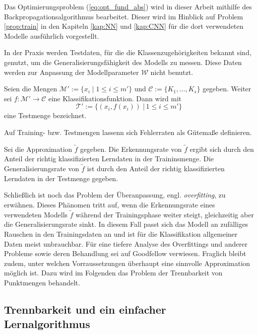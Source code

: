 Das Optimierungsproblem (\ref{eq:opt_fund_abs}) wird in dieser Arbeit mithilfe des Backpropagationsalgorithmus bearbeitet. Dieser wird im Hinblick auf Problem \ref{prop:train} in den Kapiteln \ref{kap:NN} und \ref{kap:CNN} für die dort verwendeten Modelle ausführlich vorgestellt. 

In der Praxis werden Testdaten, für die die Klassenzugehörigkeiten bekannt sind, genutzt, um die Generalisierungsfähigkeit des Modells zu messen. Diese Daten werden zur Anpassung der Modellparameter $\mathcal{W}$ nicht benutzt.

\begin{defi}[Testmenge]
    Seien die Mengen $\mathcal{M}':=\{x_i \; | \; 1 \leq i \leq m'\}$ und $\mathcal{C}:=\{K_1, \ldots, K_s \}$ gegeben. Weiter sei $f: \mathcal{M}' \rightarrow \mathcal{C}$ eine Klassifikationsfunktion. Dann wird mit 
    \begin{equation}
        \label{eq:testset}
        \mathcal{T}':=\{(x_i, f(x_i))\; | \, 1 \leq i \leq m'\}
    \end{equation}
    eine Testmenge bezeichnet.
\end{defi}
Auf Training- bzw. Testmengen lassenn sich Fehlerraten als Gütemaße definieren.

\begin{defi}
    Sei die Approximation $\tilde{f}$ gegeben.
    Die Erkennungsrate von $\tilde{f}$ ergibt sich durch den Anteil der richtig klassifizierten Lerndaten in der Traininsmenge. Die Generalisierungsrate von $\tilde{f}$ ist durch den Anteil der richtig klassifizierten Lerndaten in der Testmenge gegeben.
\end{defi}

Schließlich ist noch das Problem der Überanpassung, engl. \textit{overfitting}, zu erwähnen. Dieses Phänomen tritt auf, wenn die Erkennungsrate eines verwendeten Modells $\tilde{f}$ während der Trainingsphase weiter steigt, gleichzeitig aber die Generalisierungsrate sinkt. In diesem Fall passt sich das Modell an zufälliges Rauschen in den Trainingsdaten an und ist für die Klassifikation allgemeiner Daten meist unbrauchbar. Für eine tiefere Analyse des Overfittings und anderer Probleme sowie deren Behandlung sei auf Goodfellow\cite{Goodfellow-et-al-2016} verwiesen.
Fraglich bleibt zudem, unter welchen Vorraussetzungen überhaupt eine sinnvolle Approximation möglich ist. Dazu wird im Folgenden das Problem der Trennbarkeit von Punktmengen behandelt.
\subsection{Trennbarkeit und ein einfacher Lernalgorithmus}
\label{abs:trenn}
